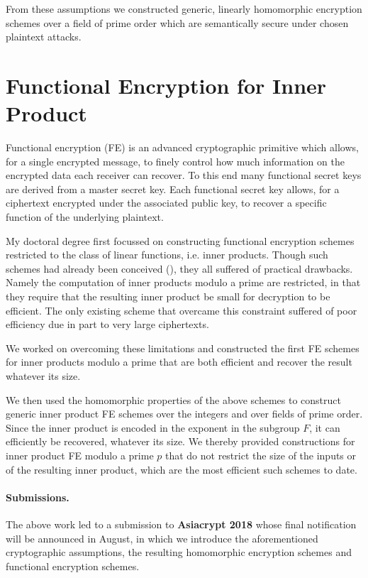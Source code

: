 \documentclass[11pt]{llncs}
\begin{document}
From these assumptions we constructed generic, linearly homomorphic encryption schemes over a field of prime order which are semantically secure under chosen plaintext attacks.


\section{Functional Encryption for Inner Product}
Functional encryption (FE) is an advanced cryptographic primitive which allows, for a single encrypted message, to finely control how much information on the encrypted data each receiver can recover. To this end many functional secret keys are derived from a master secret key. Each functional secret key allows, for a ciphertext encrypted under the associated public key, to recover a specific function of the underlying plaintext. 

My doctoral degree first focussed on constructing functional encryption schemes restricted to the class of linear functions, i.e. inner products. Though such schemes had already been conceived (\cite{PKC:ABDP15,EPRINT:ABCP16,C:AgrLibSte16}), they all suffered of practical drawbacks. Namely the computation of inner products modulo a prime are restricted, in that they require that the resulting inner product be small for decryption to be efficient. The only existing scheme that overcame this constraint suffered of poor efficiency due in part to very large ciphertexts.

We worked on overcoming these limitations and constructed the first FE schemes for inner products modulo a prime that are both efficient and recover the result whatever its size.

We then used the homomorphic properties of the above schemes to construct generic inner product FE schemes over the integers and over fields of prime order. Since the inner product is encoded in the exponent in the subgroup $F$, it can efficiently be recovered, whatever its size. 
We thereby provided constructions for inner product FE modulo a prime $p$ that do not restrict the size of the inputs or of the resulting inner product, which are the most efficient such schemes to date.
\vspace{-0.3cm}
\paragraph{Submissions.} The above work led to a submission to \textbf{Asiacrypt 2018} whose final notification will be announced in August, in which we introduce the aforementioned cryptographic assumptions, the resulting homomorphic encryption schemes and functional encryption schemes.
\end{document}
